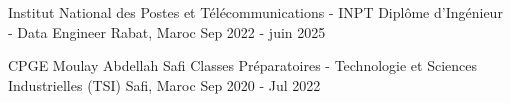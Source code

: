 
\begin{cventries}

  \cventry
    {Institut National des Postes et Télécommunications - INPT} %
    {Diplôme d'Ingénieur - Data Engineer} %
    {Rabat, Maroc} %
    {Sep 2022 - juin 2025} %
    {
      \begin{cvitems} %
      \end{cvitems}
    }
    
  \cventry
    {CPGE Moulay Abdellah Safi} %
    {Classes Préparatoires - Technologie et Sciences Industrielles (TSI)
} %
    {Safi, Maroc} %
    {Sep 2020 - Jul 2022} %
    {
      \begin{cvitems} %
      \end{cvitems}
    }
\end{cventries}
